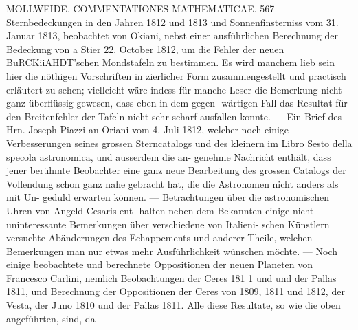 \documentclass[12pt,a4paper]{article}
\begin{document}
\newpage
MOLLWEIDE. COMMENTATIONES MATHEMATICAE. 567\newline
Sternbedeckungen in den Jahren 1812 und 1813 und Sonnenfinsterniss vom 31. Januar 1813, beobachtet\newline
von Okiani, nebst einer ausführlichen Berechnung der Bedeckung von a Stier 22. October 1812, um die\newline
Fehler der neuen BuRCKiiAHDT'schen Mondstafeln zu bestimmen. Es wird manchem lieb sein hier die\newline
nöthigen Vorschriften in zierlicher Form zusammengestellt und practisch erläutert zu sehen; vielleicht\newline
wäre indess für manche Leser die Bemerkung nicht ganz überflüssig gewesen, dass eben in dem gegen-\newline
wärtigen Fall das Resultat für den Breitenfehler der Tafeln nicht sehr scharf ausfallen konnte. --- Ein\newline
Brief des Hrn. Joseph Piazzi an Oriani vom 4. Juli 1812, welcher noch einige Verbesserungen seines\newline
grossen Sterncatalogs und des kleinern im Libro Sesto della specola astronomica, und ausserdem die an-\newline
genehme Nachricht enthält, dass jener berühmte Beobachter eine ganz neue Bearbeitung des grossen\newline
Catalogs der Vollendung schon ganz nahe gebracht hat, die die Astronomen nicht anders als mit Un-\newline
geduld erwarten können. --- Betrachtungen über die astronomischen Uhren von Angeld Cesaris ent-\newline
halten neben dem Bekannten einige nicht uninteressante Bemerkungen über verschiedene von Italieni-\newline
schen Künstlern versuchte Abänderungen des Echappements und anderer Theile, welchen Bemerkungen\newline
man nur etwas mehr Ausführlichkeit wünschen möchte. --- Noch einige beobachtete und berechnete\newline
Oppositionen der neuen Planeten von Francesco Carlini, nemlich Beobachtungen der Ceres 181 1 und und der Pallas 1811, und Berechnung der Oppositionen der Ceres von 1809, 1811 und 1812, der Vesta, der Juno 1810 und der Pallas 1811. Alle diese Resultate, so wie die oben angeführten, sind, da\newline
\end{document}
